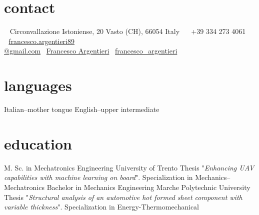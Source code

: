 \documentclass[a4,oneside]{friggeri-cv} %
\newcommand{\LinkedinColour}{{\color{linkedin} \faLinkedin}}
\newcommand{\Email}{{\color{black} \faEnvelope \,}}
\newcommand{\Skype}{{\color{skypeblue} \faSkype}}
\newcommand{\Phone}{{\color{phonegreen} \faPhone}}
\begin{document}


\begin{aside} %
  \section{contact}
  ~
  Circonvallazione Istoniense, 20
  Vasto (CH), 66054
  Italy
  ~
  \Phone \, +39 334 273 4061
  ~
  \Email \, \href{mailto:francesco.argentieri89@gmail.com}{francesco.argentieri89\\@gmail.com}
  \LinkedinColour \, \href{https://it.linkedin.com/in/francesco-argentieri}{Francesco Argentieri}
  \Skype \, \href{skype:my_username?add}{francesco\_argentieri}
  \section{languages}
  Italian--mother tongue
  English--upper intermediate
\end{aside}


\section{education}
  \begin{entrylist}
    {M. Sc. {\normalfont in Mechatronics Engineering}}
    {University of Trento}
    {Thesis "\emph{Enhancing UAV capabilities with machine learning on board}".}
    {Specialization in Mechanics--Mechatronics}
    {Bachelor {\normalfont in Mechanics Engineering}}
    {Marche Polytechnic University}
    {Thesis "\emph{Structural analysis of an automotive hot formed sheet component with variable thickness}".}
    {Specialization in Energy-Thermomechanical}
  \end{entrylist}
\end{document}
